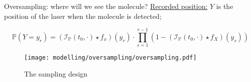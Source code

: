\begin{frame}{Oversampling: where will we see the molecule?}
\underline{Recorded position:} $Y$ is the position of the laser when the molecule is detected;

\[\mathds{P}(Y = y_{r}) = (\mathcal{I}_{\mathds{P}}(t_{0}, \cdot) \star f_{x})(y_{r}) \cdot \prod\limits_{s = 1}^{r - 1} \left(1 - \left(\mathcal{I}_{\mathds{P}}(t_{0}, \cdot) \star f_{X}\right)(y_{s})\right)\]

\begin{figure}[H]
	\label{mapping1}\caption{The sampling design}
	\centering
    \texttt{[image: modelling/oversampling/oversampling.pdf]}
\end{figure}

\end{frame}